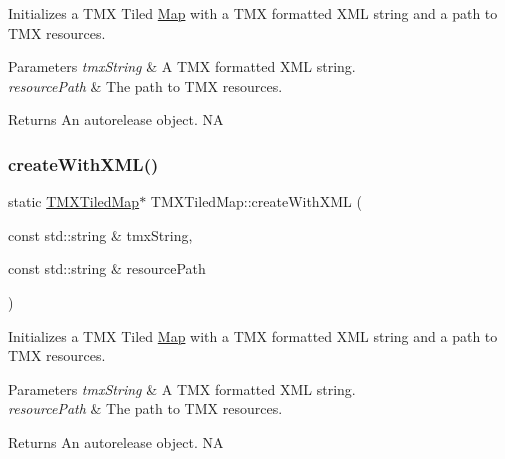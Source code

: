 Initializes a T\+MX Tiled \hyperlink{classMap}{Map} with a T\+MX formatted X\+ML string and a path to T\+MX resources.


\begin{DoxyParams}{Parameters}
{\em tmx\+String} & A T\+MX formatted X\+ML string. \\
\hline
{\em resource\+Path} & The path to T\+MX resources. \\
\hline
\end{DoxyParams}
\begin{DoxyReturn}{Returns}
An autorelease object.  NA 
\end{DoxyReturn}
\mbox{\label{classTMXTiledMap_acd5278187ebb5fcf1d1dbbd1fe42c3dd}} 
\subsubsection{\texorpdfstring{create\+With\+X\+M\+L()}{createWithXML()}\hspace{0.1cm}{\footnotesize\ttfamily [2/2]}}
{\footnotesize\ttfamily static \hyperlink{classTMXTiledMap}{T\+M\+X\+Tiled\+Map}$\ast$ T\+M\+X\+Tiled\+Map\+::create\+With\+X\+ML (\begin{DoxyParamCaption}\item[{const std\+::string \&}]{tmx\+String,  }\item[{const std\+::string \&}]{resource\+Path }\end{DoxyParamCaption})\hspace{0.3cm}{\ttfamily [static]}}

Initializes a T\+MX Tiled \hyperlink{classMap}{Map} with a T\+MX formatted X\+ML string and a path to T\+MX resources.


\begin{DoxyParams}{Parameters}
{\em tmx\+String} & A T\+MX formatted X\+ML string. \\
\hline
{\em resource\+Path} & The path to T\+MX resources. \\
\hline
\end{DoxyParams}
\begin{DoxyReturn}{Returns}
An autorelease object.  NA 
\end{DoxyReturn}
\mbox{\label{classTMXTiledMap_adf91a0a108c7e78b84716cd926d96113}} 
